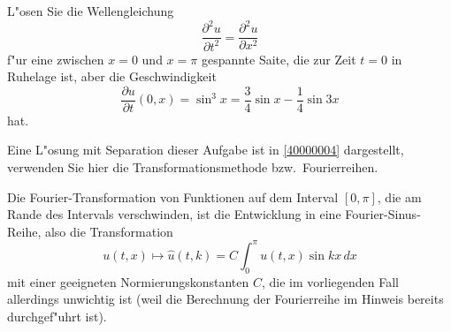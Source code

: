 L"osen Sie die Wellengleichung
\[
\frac{\partial^2 u}{\partial t^2}=\frac{\partial^2 u}{\partial x^2}
\]
f"ur eine zwischen $x=0$ und $x=\pi$ gespannte Saite,
die zur Zeit $t=0$ in Ruhelage ist, aber die Geschwindigkeit
\[
\frac{\partial u}{\partial t}(0, x)
=
\sin^3 x=\frac34\sin x-\frac14\sin 3x
\]
hat.

\begin{hinweis}
Eine L"osung mit Separation dieser Aufgabe ist in \ref{40000004}
dargestellt, verwenden Sie hier die Transformationsmethode bzw.~Fourierreihen.
\end{hinweis}

\begin{loesung}
Die Fourier-Transformation
von Funktionen auf dem Interval $[0,\pi]$, die am Rande
des Intervals verschwinden, ist die Entwicklung in eine Fourier-Sinus-Reihe,
also die Transformation 
\[u(t,x) \mapsto \hat u(t, k)= C\int_0^{\pi} u(t,x)\sin kx\, dx\]
mit einer geeigneten Normierungskonstanten $C$, die im vorliegenden
Fall allerdings unwichtig ist (weil die Berechnung der Fourierreihe
im Hinweis bereits durchgef"uhrt ist).


\end{loesung}

